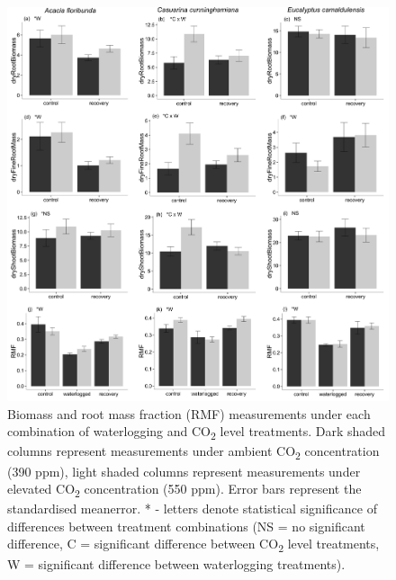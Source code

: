 \documentclass[12pt,a4paper]{memoir}
\begin{document}
\begin{figure}[h!t]
\begin{center}
\includegraphics[width=\linewidth, keepaspectratio=true]{biomass2.png} %
\caption[Biomass and root mass fraction (RMF) measurements under each combination of waterlogging and CO\textsubscript{2} level treatments.]{\small{Biomass and root mass fraction (RMF) measurements under each combination of waterlogging and CO\textsubscript{2} level treatments. Dark shaded columns represent measurements under ambient CO\textsubscript{2} concentration (390 ppm), light shaded columns represent measurements under elevated CO\textsubscript{2} concentration (550 ppm). Error bars represent the standardised meanerror. * - letters denote statistical significance of differences between treatment combinations (NS = no significant difference, C = significant difference between CO\textsubscript{2} level treatments, W = significant difference between waterlogging treatments).}} %
\label{Ch5_F2} %
\end{center}
\end{figure}
\end{document}
